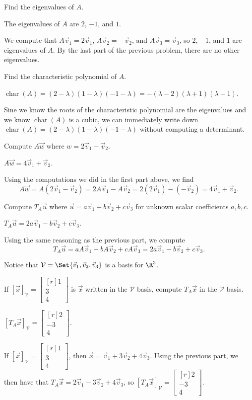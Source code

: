 \documentclass{problemset}
\DeclareMathOperator{\chr}{char}
\newcommand{\mat}[1]{\begin{bmatrix*}[r]#1\end{bmatrix*}}
\begin{document}
	\begin{parts}
		\item Find the eigenvalues of $A$.
			\begin{solution}
				The eigenvalues of $A$ are $2$, $-1$, and $1$.

				We compute that $A\vec v_1=2\vec v_1$, $A\vec v_2=-\vec v_2$,
				and $A\vec v_3=\vec v_3$, so $2$, $-1$, and $1$ are eigenvalues
				of $A$. By the last part of the previous problem, there are no
				other eigenvalues.
			\end{solution}
		\item Find the characteristic polynomial of $A$.
			\begin{solution}
				$\chr(A)=(2-\lambda)(1-\lambda)(-1-\lambda)=-(\lambda-2)(\lambda+1)(\lambda-1)$.
				
				Sine we know the roots of the characteristic polynomial are the eigenvalues and
				we know $\chr(A)$ is a cubic, we can immediately write down
				$\chr(A)=(2-\lambda)(1-\lambda)(-1-\lambda)$ without computing a determinant.
			\end{solution}
		\item Compute $A\vec w$ where $w=2\vec v_1-\vec v_2$.
			\begin{solution}
				$A\vec w=4\vec v_1+\vec v_2$.

				Using the computations we did in the first part above, we find
				\[
					A\vec w
					=A(2\vec v_1-\vec v_2)
					=2A\vec v_1-A\vec v_2
					=2(2\vec v_1)-(-\vec v_2)
					=4\vec v_1+\vec v_2.
				\]
			\end{solution}
		\item Compute $T_A\vec u$ where $\vec u=a\vec v_1+b\vec v_2+c\vec v_3$ for
			unknown scalar coefficients $a,b,c$.
			\begin{solution}
				$T_A\vec u=2a\vec v_1-b\vec v_2+c\vec v_3$.

				Using the same reasoning as the previous part, we compute
				\[
					T_A\vec u
					=aA\vec v_1+bA\vec v_2+cA\vec v_3
					=2a\vec v_1-b\vec v_2+c\vec v_3.
				\]
			\end{solution}
	\end{parts}
	Notice that $\mathcal V=\Set{\vec v_1,\vec v_2,\vec v_3}$ is a basis for $\R^3$.
	\begin{parts}[resume]
	\item If $[\vec x]_{\mathcal V}=\mat{1\\3\\4}$ is $\vec x$ written in the $\mathcal V$ basis,
		compute $T_A\vec x$ in the $\mathcal V$ basis.
		\begin{solution}
			$[T_A\vec x]_{\mathcal V}=\mat{2\\-3\\4}$.

			If $[\vec x]_{\mathcal V}=\mat{1\\3\\4}$, then
			$\vec x=\vec v_1+3\vec v_2+4\vec v_3$. Using the previous part, we
			then have that $T_A\vec x=2\vec v_1-3\vec v_2+4\vec v_3$, so
			$[T_A\vec x]_{\mathcal V}=\mat{2\\-3\\4}$.
		\end{solution}
	\end{parts}
\end{document}
